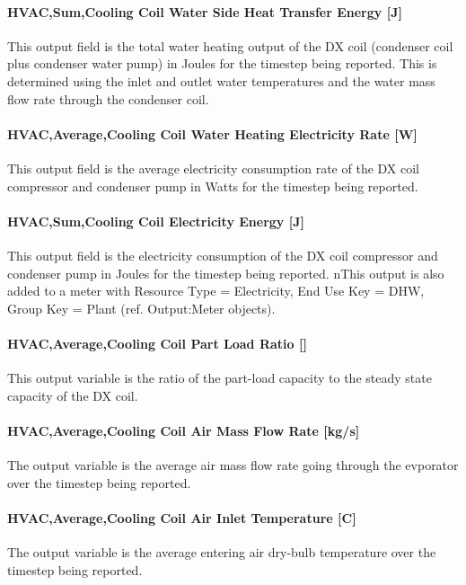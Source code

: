 \paragraph{HVAC,Sum,Cooling Coil Water Side Heat Transfer Energy {[}J{]}}\label{vshpwhheating-output-cooling-coil-water-side-heat-transfer-energy}
This output field is the total water heating output of the DX coil (condenser coil plus condenser water pump) in Joules for the timestep being reported.
This is determined using the inlet and outlet water temperatures and the water mass flow rate through the condenser coil.

\paragraph{HVAC,Average,Cooling Coil Water Heating Electricity Rate {[}W{]}}\label{vshpwhheating-output-cooling-coil-water-heating-electric-power}
This output field is the average electricity consumption rate of the DX coil compressor and condenser pump in Watts for the timestep being reported.

\paragraph{HVAC,Sum,Cooling Coil Electricity Energy {[}J{]}}\label{vshpwhheating-output-cooling-coil-electric-energy}
This output field is the electricity consumption of the DX coil compressor and condenser pump in Joules for the timestep being reported.
nThis output is also added to a meter with Resource Type = Electricity, End Use Key = DHW, Group Key = Plant (ref. Output:Meter objects).

\paragraph{HVAC,Average,Cooling Coil Part Load Ratio {[}{]}}\label{vshpwhheating-output-cooling-coil-part-load-ratio}
This output variable is the ratio of the part-load capacity to the steady state capacity of the DX coil.

\paragraph{HVAC,Average,Cooling Coil Air Mass Flow Rate {[}kg/s{]}}\label{vshpwhheating-output-cooling-coil-air-mass-flow-rate}
The output variable is the average air mass flow rate going through the evporator over the timestep being reported.

\paragraph{HVAC,Average,Cooling Coil Air Inlet Temperature {[}C{]}}\label{vshpwhheating-output-cooling-coil-air-inlet-temperature}
The output variable is the average entering air dry-bulb temperature over the timestep being reported.

